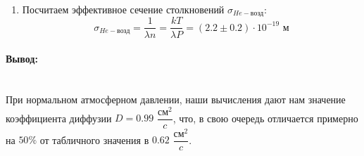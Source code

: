 \documentclass[12pt,a4paper]{article}
\begin{document}
\begin{enumerate}
		\item Посчитаем эффективное сечение столкновений $\sigma_{He-возд}$: \\
			\begin{equation*}
				\sigma_{He-возд} = \dfrac{1}{\lambda n} = \dfrac{kT}{\lambda P} = (2.2 \pm 0.2) \cdot 10^{-19} \text{ м}
			\end{equation*}
	\end{enumerate}
	
	\paragraph{Вывод:} ~\\
		При нормальном атмосферном давлении, наши вычисления дают нам значение коэффициента диффузии $D = 0.99$ $\dfrac{см^2}{c}$, что, в свою очередь отличается примерно на $50\%$ от табличного значения в $0.62$ $\dfrac{см^2}{c}$.
\end{document}
